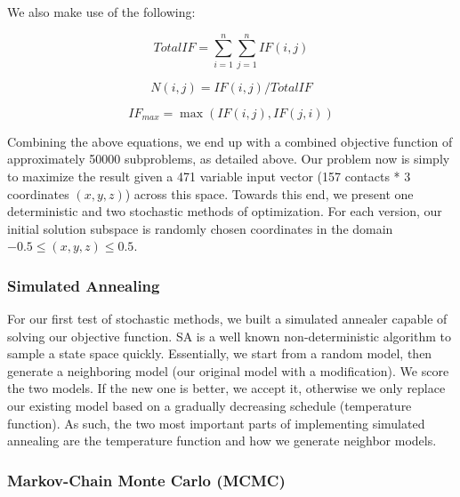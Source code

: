 \documentclass{article}
\begin{document}
We also make use of the following:

\begin{equation}
      TotalIF = \sum_{i=1}^{n} \sum_{j=1}^{n} IF(i,j)
\end{equation}

\begin{equation}
      N(i,j) = IF(i,j)/TotalIF
\end{equation}

\begin{equation}
      IF_{max} = \max(IF(i,j),IF(j,i))
\end{equation}

Combining the above equations, we end up with a combined objective function of approximately 50000 subproblems, as detailed above.  Our problem now is simply to maximize the result given a 471 variable input vector (157 contacts * 3 coordinates $(x, y, z)$) across this space.  Towards this end, we present one deterministic and two stochastic methods of optimization.  For each version, our initial solution subspace is randomly chosen coordinates in the domain $-0.5 \leq (x, y, z) \leq 0.5$.

\subsubsection{Simulated Annealing}

For our first test of stochastic methods, we built a simulated annealer capable of solving our objective function.  SA is a well known non-deterministic algorithm to sample a state space quickly.  Essentially, we start from a random model, then generate a neighboring model (our original model with a modification).  We score the two models.  If the new one is better, we accept it, otherwise we only replace our existing model based on a gradually decreasing schedule (temperature function).  As such, the two most important parts of implementing simulated annealing are the temperature function and how we generate neighbor models.


\subsubsection{Markov-Chain Monte Carlo (MCMC)}
\end{document}
